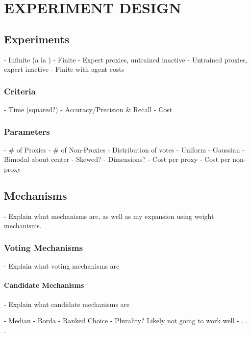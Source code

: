 %
%

\chapter{EXPERIMENT DESIGN}\label{ch:experiment-design}



\section{Experiments}\label{sec:experiments}
- Infinite (a la \cite{Cohensius2017})
- Finite
- Expert proxies, untrained inactive
- Untrained proxies, expert inactive
- Finite with agent costs

\subsection{Criteria}\label{subsec:criteria}
- Time (squared?)
- Accuracy/Precision \& Recall
- Cost

\subsection{Parameters}\label{subsec:parameters}
- \# of Proxies
- \# of Non-Proxies
- Distribution of votes
    - Uniform
    - Gaussian
    - Bimodal about center
    - Skewed?
- Dimensions?
- Cost per proxy
- Cost per non-proxy

\section{Mechanisms}\label{sec:mechanisms}
- Explain what mechanisms are, as well as my expansion using weight mechanisms.

\subsection{Voting Mechanisms}\label{subsec:voting-mechanisms}
- Explain what voting mechanisms are

\subsubsection{Candidate Mechanisms}\label{subsubsec:candidate-mechanisms}
- Explain what candidate mechanisms are

- Median
- Borda
- Ranked Choice
- Plurality? Likely not going to work well
- . . .


